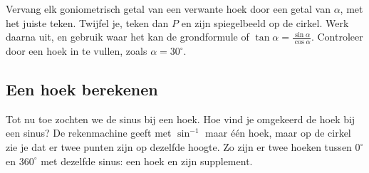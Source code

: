 
\begin{werkwijze}
Vervang elk goniometrisch getal van een verwante hoek door een getal van $\alpha$, met het juiste teken. Twijfel je, teken dan $P$ en zijn spiegelbeeld op de cirkel. Werk daarna uit, en gebruik waar het kan de grondformule of $\tan\alpha = \frac{\sin\alpha}{\cos\alpha}$. Controleer door een hoek in te vullen, zoals $\alpha = 30^\circ$.
\end{werkwijze}


\begin{oefeningen}
\end{oefeningen}

\subsection{Een hoek berekenen}

Tot nu toe zochten we de sinus bij een hoek. Hoe vind je omgekeerd de hoek bij een sinus? De rekenmachine geeft met $\sin^{-1}$ maar één hoek, maar op de cirkel zie je dat er twee punten zijn op dezelfde hoogte. Zo zijn er twee hoeken tussen $0^\circ$ en $360^\circ$ met dezelfde sinus: een hoek en zijn supplement.

